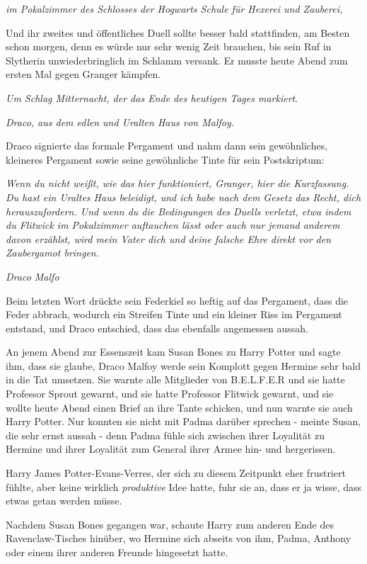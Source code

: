 {\emph{im Pokalzimmer des Schlosses der Hogwarts Schule für Hexerei und Zauberei,}

Und ihr zweites und öffentliches Duell sollte besser bald stattfinden, am Besten schon morgen, denn es würde nur sehr wenig Zeit brauchen, bis sein Ruf in Slytherin unwiederbringlich im Schlamm versank. Er musste heute Abend zum ersten Mal gegen Granger kämpfen.

\emph{Um Schlag Mitternacht, der das Ende des heutigen Tages markiert}.

\emph{Draco, aus dem edlen und Uralten Haus von Malfoy.}

Draco signierte das formale Pergament und nahm dann sein gewöhnliches, kleineres Pergament sowie seine gewöhnliche Tinte für sein Postskriptum:

\emph{Wenn du nicht weißt, wie das hier funktioniert, Granger, hier die Kurzfassung. Du hast ein Uraltes Haus beleidigt, und ich habe nach dem Gesetz das Recht, dich herauszufordern. Und wenn du die Bedingungen des Duells verletzt, etwa indem du Flitwick im Pokalzimmer auftauchen lässt oder auch nur jemand anderem davon erzählst, wird mein Vater dich und deine falsche Ehre direkt vor den Zaubergamot bringen.}

\emph{Draco Malfo}

Beim letzten Wort drückte sein Federkiel so heftig auf das Pergament, dass die Feder abbrach, wodurch ein Streifen Tinte und ein kleiner Riss im Pergament entstand, und Draco entschied, dass das ebenfalls angemessen aussah.

An jenem Abend zur Essenszeit kam Susan Bones zu Harry Potter und sagte ihm, dass sie glaube, Draco Malfoy werde sein Komplott gegen Hermine sehr bald in die Tat umsetzen. Sie warnte alle Mitglieder von B.E.L.F.E.R und sie hatte Professor Sprout gewarnt, und sie hatte Professor Flitwick gewarnt, und sie wollte heute Abend einen Brief an ihre Tante schicken, und nun warnte sie auch Harry Potter. Nur konnten sie nicht mit Padma darüber sprechen - meinte Susan, die sehr ernst aussah - denn Padma fühle sich zwischen ihrer Loyalität zu Hermine und ihrer Loyalität zum General ihrer Armee hin- und hergerissen.

Harry James Potter-Evans-Verres, der sich zu diesem Zeitpunkt eher frustriert fühlte, aber keine wirklich \emph{produktive} Idee hatte, fuhr sie an, dass er ja wisse, dass etwas getan werden müsse.

Nachdem Susan Bones gegangen war, schaute Harry zum anderen Ende des Ravenclaw-Tisches hinüber, wo Hermine sich abseits von ihm, Padma, Anthony oder einem ihrer anderen Freunde hingesetzt hatte.

}

